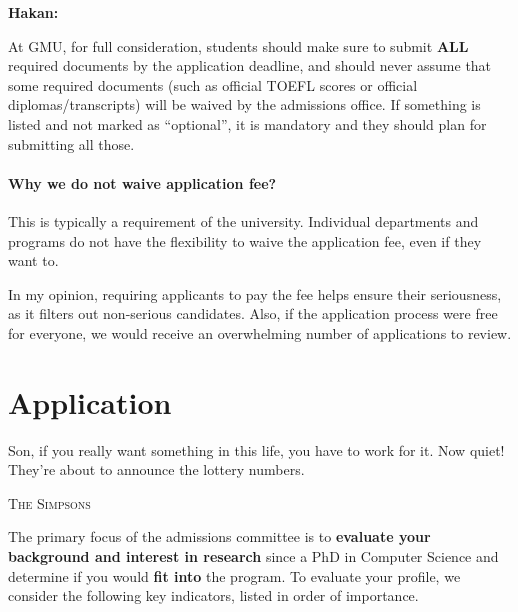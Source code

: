 \documentclass[11pt]{article}
\newenvironment{commentbox}[1][]{
\small
    \begin{cbox}
    \textbf{#1} 
 }{
   \end{cbox}
}
\begin{document}
\begin{commentbox}[Hakan:]
At GMU, for full consideration, students should make sure to submit \textbf{ALL} required documents by the application deadline, and should never assume that some required documents (such as official TOEFL scores or official diplomas/transcripts) will be waived by the admissions office. If something is listed and not marked as ``optional'', it is mandatory and they should plan for submitting all those.  
\end{commentbox}
\paragraph{Why we do not waive application fee?}  This is typically a requirement of the university. Individual departments and programs do not have the flexibility to waive the application fee, even if they want to. 

In my opinion, requiring applicants to pay the fee helps ensure their seriousness, as it filters out non-serious candidates. Also, if the application process were free for everyone, we would receive an overwhelming number of applications to review.




\section{Application}\label{sec:application}

\epigraph{Son, if you really want something in this life, you have to work for it. Now quiet! They’re about to announce the lottery numbers.}{\textsc{The Simpsons}}


The primary focus of the admissions committee is to \textbf{evaluate your background and interest in research} since a PhD in Computer Science and determine if you would \textbf{fit into} the program. To evaluate your profile, we consider
the following key indicators, listed in order of importance.
\end{document}
